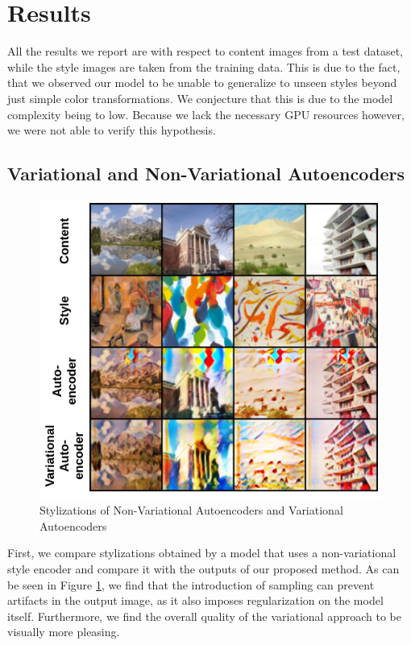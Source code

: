 \documentclass[10pt,twocolumn,letterpaper]{article}
\begin{document}
\section{Results}

All the results we report are with respect to content images from a test dataset, while the style images are taken from the training data. This is due to the fact, that we observed our model to be unable to generalize to unseen styles beyond just simple color transformations. We conjecture that this is due to the model complexity being to low. Because we lack the necessary GPU resources however, we were not able to verify this hypothesis.

\subsection{Variational and Non-Variational Autoencoders}
	
\begin{figure}
\centering
\includegraphics[width=0.9\linewidth]{ae_vs_vae.png}
\caption{Stylizations of Non-Variational Autoencoders and Variational Autoencoders}
\label{fig:ae_vae}
\end{figure}

First, we compare stylizations obtained by a model that uses a non-variational style encoder and compare it with the outputs of our proposed method. As can be seen in Figure \ref{fig:ae_vae}, we find that the introduction of sampling can prevent artifacts in the output image, as it also imposes regularization on the model itself. Furthermore, we find the overall quality of the variational approach to be visually more pleasing.
\end{document}
